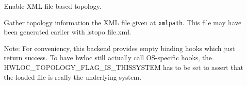 Enable XML-file based topology. 

Gather topology information the XML file given at {\tt xmlpath}. This file may have been generated earlier with lstopo file.xml.

\begin{Desc}
\item[Note:]For conveniency, this backend provides empty binding hooks which just return success. To have hwloc still actually call OS-specific hooks, the HWLOC\_\-TOPOLOGY\_\-FLAG\_\-IS\_\-THISSYSTEM has to be set to assert that the loaded file is really the underlying system. \end{Desc}
